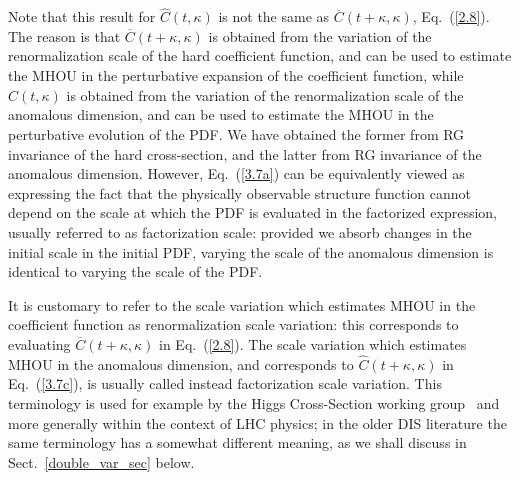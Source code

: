 Note that this result for $\widehat{C}(t, \kappa)$ is not the same as $\overline{C}(t + \kappa, \kappa)$,
Eq.~(\ref{2.8}).
%
The reason is that 
$\overline{C}(t + \kappa, \kappa)$ is obtained from the
variation of the renormalization scale of the hard coefficient
function, and can be used to estimate the MHOU in the perturbative
expansion of the coefficient function, while $\widehat{C}(t, \kappa)$
is obtained from the variation of the renormalization scale of the
anomalous dimension, and can be used to estimate the MHOU in the
perturbative evolution of the PDF.
%
We have obtained the former from
RG invariance of the hard cross-section, and the
latter from RG invariance of the anomalous dimension.
%
However,
Eq.~(\ref{3.7a}) can be equivalently viewed as expressing the fact
that the physically observable structure function cannot depend on the
scale at which the PDF is evaluated in the factorized expression,
usually referred to as factorization scale: provided we absorb changes
in the initial scale in 
the initial PDF, varying the scale of the anomalous dimension is
identical to
varying the scale of the  PDF.

It is customary to refer to the  scale variation which
estimates MHOU in the coefficient function as renormalization scale
variation: this corresponds to evaluating $\overline{C}(t +\kappa, \kappa)$ in
Eq.~(\ref{2.8}).
%
The scale variation
which estimates MHOU in the
anomalous dimension, and corresponds to $\widehat{C}(t +
\kappa, \kappa)$ in Eq.~(\ref{3.7c}), is usually called instead
factorization scale variation.
%
This terminology
is used for example by the Higgs Cross-Section working group~\cite{deFlorian:2016spz} and more generally within the context of LHC physics; in the older DIS literature
the same terminology has a somewhat different meaning, as we shall
discuss in Sect.~\ref{double_var_sec} below. 

